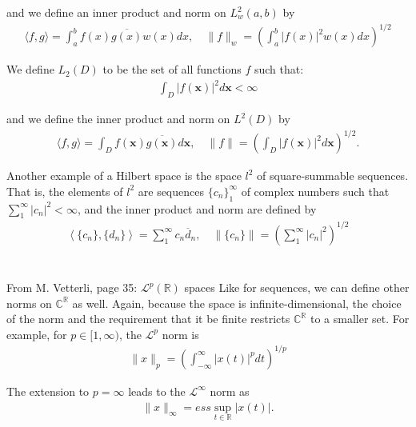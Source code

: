 and we define an inner product and norm on $L_w^2(a,b)$ by
\begin{align*}
\langle f,g \rangle = \int_a^b f(x) \overline{g(x)} w(x) dx, \quad \|f\|_w = \left( \int_a^b |f(x)|^2 w(x) dx \right)^{1/2}
\end{align*}

We define $L_2(D)$ to be the set of all functions $f$ such that:
\begin{align*}
\int_D |f(\textbf{x})|^2 d\textbf{x} < \infty
\end{align*}

and we define the inner product and norm on $L^2(D)$ by
\begin{align*}
\langle f,g \rangle = \int_D f(\textbf{x}) \overline{g(\textbf{x})} d \textbf{x}, \quad \|f\| = \left( \int_D |f(\textbf{x})|^2 d \textbf{x} \right)^{1/2}.
\end{align*}

Another example of a Hilbert space is the space $l^2$ of square-summable sequences. That is, the elements of $l^2$ are sequences $\{c_n\}_1^\infty$ of complex numbers such that $\sum_1^\infty |c_n|^2 < \infty$, and the inner product and norm are defined by
\begin{align*}
\left\langle \{c_n\},\{d_n\} \right\rangle = \sum_1^\infty c_n \overline{d}_n, \quad \left\| \{c_n\} \right\| = \left( \sum_1^\infty  |c_n|^2 \right)^{1/2}
\end{align*}
\\ \\
From M. Vetterli, page 35:
$\mathcal{L}^p(\mathbb{R})$ spaces Like for sequences, we can define other norms on $\mathbb{C}^\mathbb{R}$ as well. Again, because the space is infinite-dimensional, the choice of the norm and the requirement that it be finite restricts $\mathbb{C}^\mathbb{R}$ to a smaller set. For example, for $p \in [1,\infty)$, the $\mathcal{L}^p$ norm is
\begin{align*}
\|x\|_p = \left( \int_{-\infty}^{\infty} |x(t)|^p dt \right)^{1/p}
\end{align*}

The extension to $p = \infty$ leads to the $\mathcal{L}^\infty$ norm as
\begin{align*}
\|x\|_\infty = ess \sup_{t\in\mathbb{R}} |x(t)|.
\end{align*}